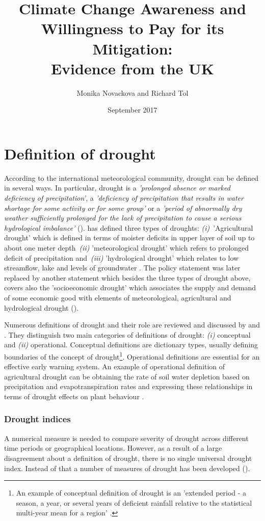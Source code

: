 \documentclass[a4paper,12pt]{article}
\date{\normalsize{September 2017}}
\title{\Large \bf Climate Change Awareness and Willingness to Pay for its Mitigation: \\ Evidence from the UK}
\author{Monika Novackova and Richard Tol}
\affil{\small{Department of Economics, University of Sussex, Falmer, UK}}
\begin{document}
\sloppy
\section*{Definition of drought}
According to the international meteorological community, drought can be defined in several ways. In particular, drought is a \textit{'prolonged absence or marked deficiency of precipitation'}, a \textit{'deficiency of precipitation that results in water shortage for some activity or for some group'} or a \textit{'period of abnormally dry weather sufficiently prolonged for the lack of precipitation to cause a serious hydrological imbalance'} (\citealp{Heim2002, IPCCtrenberth}).
 \cite{AMS1997} has defined three types of droughts: \textit{(i)}~'Agricultural drought' which is defined in terms of moister deficits in upper layer of soil up to about one meter depth~\textit{(ii)} 'meteorological drought' which refers to prolonged deficit of precipitation and~\textit{(iii)} 'hydrological drought' which relates to low streamflow, lake and levels of groundwater . The  \cite{AMS1997} policy statement was later replaced by another statement \citep{AMS2013} which besides the three types of drought above, covers also the 'socioeconomic drought' which associates the supply and demand of some economic good with elements of meteorological, agricultural and hydrological drought (\citealt{Heim2002, IPCCtrenberth}).
 
Numerous definitions of drought and their role are reviewed and discussed by \cite{wilhite1985} and \cite{wilhite2000}. They distinguish two main categories of definitions of drought: \textit{(i)} conceptual and \textit{(ii)} operational. Conceptual definitions are dictionary types, usually defining boundaries of the concept of drought\footnote{An example of conceptual definition of drought is an 'extended period - a season, a year, or several years of deficient rainfall relative to the statistical multi-year mean for a region' \cite{schneider1996}.}. Operational definitions are essential for an effective early warning system. An example of operational definition of agricultural drought can be obtaining the rate of soil water depletion based on precipitation and evapotranspiration rates and expressing these relationships in terms of drought effects on plant behaviour \citep{wilhite2000}.

\subsubsection*{Drought indices}
A numerical measure is needed to compare severity of drought across different time periods or geographical locations. However, as a result of a large disagreement about a definition of drought, there is no single universal drought index. Instead of that a number of measures of drought has been developed (\citealp{Heim2002, wilhite1985, wilhite2000}). 
\end{document}
